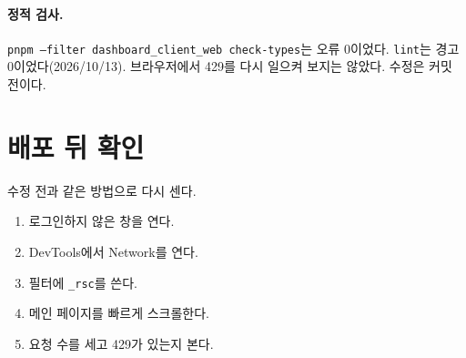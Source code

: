 \paragraph{정적 검사.}
\texttt{pnpm --filter dashboard\_client\_web check-types}는 오류 0이었다.
\texttt{lint}는 경고 0이었다(2026/10/13).
브라우저에서 429를 다시 일으켜 보지는 않았다.
수정은 커밋 전이다.

\section{배포 뒤 확인}\label{sec:pf-verify}

\begin{callout}[배포 뒤 확인 (오너)]
수정 전과 같은 방법으로 다시 센다.
\begin{enumerate}[nosep]
  \item 로그인하지 않은 창을 연다.
  \item DevTools에서 Network를 연다.
  \item 필터에 \texttt{\_rsc}를 쓴다.
  \item 메인 페이지를 빠르게 스크롤한다.
  \item 요청 수를 세고 429가 있는지 본다.
\end{enumerate}
\end{callout}
